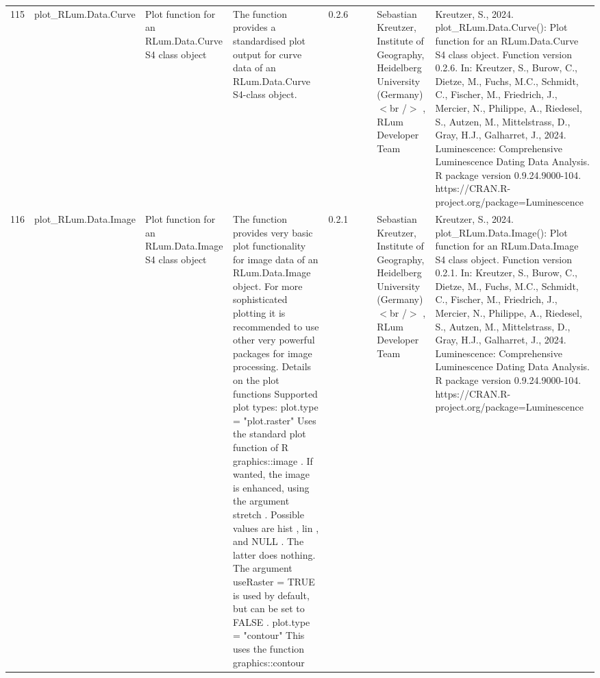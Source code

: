 \begin{table}[ht]
\begin{tabular}{rllllllll}
  115 & plot\_RLum.Data.Curve & Plot function for an RLum.Data.Curve S4 class object & The function provides a standardised plot output for curve data of an RLum.Data.Curve  S4-class object. & 0.2.6
 &  &  & Sebastian Kreutzer, Institute of Geography, Heidelberg University (Germany)$<$br /$>$ , RLum Developer Team & Kreutzer, S., 2024. plot\_RLum.Data.Curve(): Plot function for an RLum.Data.Curve S4 class object. Function version 0.2.6. In: Kreutzer, S., Burow, C., Dietze, M., Fuchs, M.C., Schmidt, C., Fischer, M., Friedrich, J., Mercier, N., Philippe, A., Riedesel, S., Autzen, M., Mittelstrass, D., Gray, H.J., Galharret, J., 2024. Luminescence: Comprehensive Luminescence Dating Data Analysis. R package version 0.9.24.9000-104. https://CRAN.R-project.org/package=Luminescence
 \\ 
  116 & plot\_RLum.Data.Image & Plot function for an  RLum.Data.Image  S4 class object & The function provides very basic plot functionality for image data of an RLum.Data.Image  object. For more sophisticated plotting it is recommended to use other very powerful packages for image processing.  Details on the plot functions   Supported plot types:  plot.type = "plot.raster"   Uses the standard plot function of R  graphics::image . If wanted, the image is enhanced, using the argument  stretch . Possible values are  hist ,  lin , and NULL . The latter does nothing. The argument  useRaster = TRUE  is used by default, but can be set to  FALSE .  plot.type = "contour"   This uses the function  graphics::contour & 0.2.1
 &  &  & Sebastian Kreutzer, Institute of Geography, Heidelberg University (Germany)$<$br /$>$ , RLum Developer Team & Kreutzer, S., 2024. plot\_RLum.Data.Image(): Plot function for an RLum.Data.Image S4 class object. Function version 0.2.1. In: Kreutzer, S., Burow, C., Dietze, M., Fuchs, M.C., Schmidt, C., Fischer, M., Friedrich, J., Mercier, N., Philippe, A., Riedesel, S., Autzen, M., Mittelstrass, D., Gray, H.J., Galharret, J., 2024. Luminescence: Comprehensive Luminescence Dating Data Analysis. R package version 0.9.24.9000-104. https://CRAN.R-project.org/package=Luminescence
 \\ 

\end{tabular}
\end{table}
